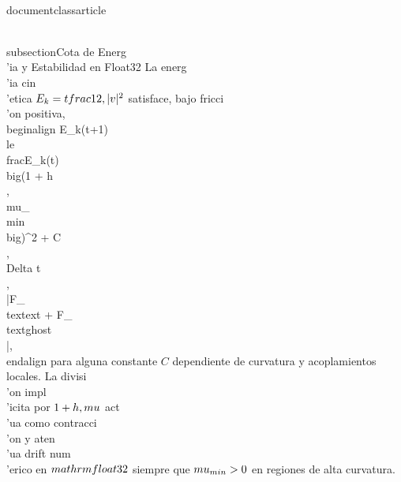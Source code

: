 \\documentclass{article}
\begin{document}
\\subsection{Cota de Energ\\'ia y Estabilidad en Float32}
La energ\\'ia cin\\'etica $E_k = \\tfrac{1}{2}\\,\\|v\\|^2$ satisface, bajo fricci\\'on positiva,
\\begin{align}
E_k(t+1) \\le \\frac{E_k(t)}{\\big(1 + h\\,\\mu_{\\min}\\big)^2} + C\\,\\Delta t\\,\\|F_{\\text{ext}} + F_{\\text{ghost}}\\|,
\\end{align}
para alguna constante $C$ dependiente de curvatura y acoplamientos locales. La divisi\\'on impl\\'icita por $1 + h\\,\\mu$ act\\'ua como contracci\\'on y aten\\'ua drift num\\'erico en $\\mathrm{float32}$ siempre que $\\mu_{\\min} > 0$ en regiones de alta curvatura.
\end{document}
